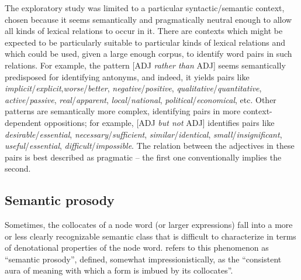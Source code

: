 The exploratory  study was limited to a particular syntactic\slash semantic  context, chosen because it seems semantically and pragmatically  neutral enough to allow all kinds of lexical relations to occur in it. There are contexts which might be expected to be particularly suitable to particular kinds of lexical relations and which could be used, given a large  enough corpus, to identify word pairs in such relations. For example, the pattern [ADJ \textit{rather than} ADJ] seems semantically predisposed for identifying antonyms,  and indeed, it yields pairs like \textit{implicit}\slash \textit{explicit},\linebreak \textit{worse}\slash \textit{better}, \textit{negative}\slash \textit{positive}, \textit{qualitative}\slash \textit{quantitative}, \textit{active}\slash\textit{passive}, \textit{real}\slash\textit{appar\-ent}, \textit{local}\slash \textit{national}, \textit{political}\slash \textit{economical}, etc. Other patterns are semantically more complex, identifying pairs in more context\hyp{}dependent oppositions; for example, [ADJ \textit{but not} ADJ] identifies pairs like \textit{desirable}\slash \textit{essential}, \textit{necessary}\slash \textit{sufficient}, \textit{similar}\slash \textit{identical}, \textit{small}\slash \textit{insignificant}, \textit{useful}\slash \textit{essential}, \textit{difficult}\slash \textit{impossible}. The relation between the adjectives  in these pairs is best described as pragmatic  -- the first one conventionally  implies the second.

\subsection{Semantic prosody}\label{sec:semanticprosody}\largerpage

Sometimes, the collocates  of a node word (or larger expressions) fall into a more or less clearly recognizable semantic  class that is difficult to characterize in terms of denotational properties of the node word. \citet[157]{louw_irony_1993} refers to this phenomenon as ``semantic prosody'', defined, somewhat impressionistically, as the ``consistent aura of meaning with which a form is imbued by its  collocates''.

